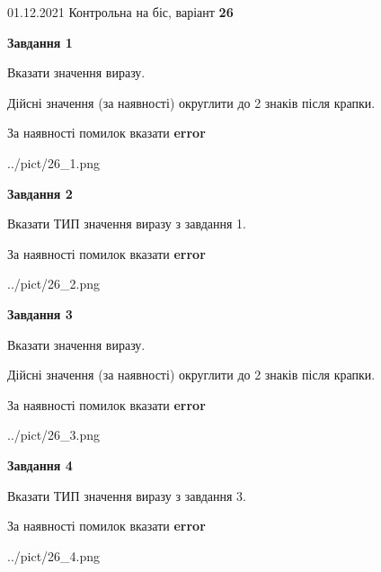 \documentclass[11pt, ukrainian]{article}
\begin{document}
{01.12.2021 Контрольна на біс, варіант  \No \textbf { 26 }\par}
{
\begin {large}
{\begin {center}\textbf{Завдання 1}\end {center}}\par
Вказати значення виразу. \par
Дійсні значення (за наявності) округлити до 2 знаків після крапки. \par
За наявності помилок вказати \textbf{error}

\begin{center}
	{../pict/26_1.png}
\end{center}
\newpage

{\begin {center}\textbf{Завдання 2}\end {center}}\par
Вказати ТИП значення виразу з завдання 1. \par
За наявності помилок вказати \textbf{error}

\begin{center}
	{../pict/26_2.png}
\end{center}
\newpage

{\begin {center}\textbf{Завдання 3}\end {center}}\par
Вказати значення виразу. \par
Дійсні значення (за наявності) округлити до 2 знаків після крапки. \par
За наявності помилок вказати \textbf{error}

\begin{center}
	{../pict/26_3.png}
\end{center}
\newpage

{\begin {center}\textbf{Завдання 4}\end {center}}\par
Вказати ТИП значення виразу з завдання 3. \par
За наявності помилок вказати \textbf{error}

\begin{center}
	{../pict/26_4.png}
\end{center}
\newpage


\end{large}}
\end{document}
